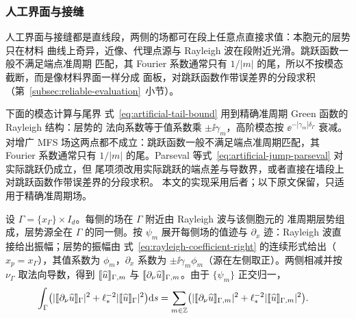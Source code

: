 \subsubsection{人工界面与接缝}

人工界面与接缝都是直线段，两侧的场都可在段上任意点直接求值：本胞元的层势只在材料
曲线上奇异，近像、代理点源与 Rayleigh 波在段附近光滑。跳跃函数一般不满足端点准周期
匹配，其 Fourier 系数通常只有 $1/|m|$ 的尾，所以不按模态截断，而是像材料界面一样分成
面板，对跳跃函数作带误差界的分段求积（第~\ref{subsec:reliable-evaluation}~小节）。


\begin{workonly}
下面的模态计算与尾界
式~\eqref{eq:artificial-tail-bound} 用到精确准周期 Green 函数的 Rayleigh 结构：层势的
法向系数等于值系数乘 $\pm\ii\gamma_m$，高阶模态按 $\ee^{-|\gamma_m|\delta_\Gamma}$ 衰减。
对增广 MFS 场这两点都不成立：跳跃函数一般不满足端点准周期匹配，其 Fourier 系数通常只有
$1/|m|$ 的尾。Parseval 等式~\eqref{eq:artificial-jump-parseval} 对实际跳跃仍成立，但
尾项须改用实际跳跃的端点差与导数界，或者直接在墙段上对跳跃函数作带误差界的分段求积。
本文的实现采用后者；以下原文保留，只适用于精确准周期场。

设 $\Gamma=\{x_\Gamma\}\times I_d$。每侧的场在 $\Gamma$ 附近由 Rayleigh 波与该侧胞元的
准周期层势组成，层势源全在 $\Gamma$ 的同一侧。按 $\psi_m$ 展开每侧场的值迹与
$\partial_x$ 迹：Rayleigh 波直接给出振幅；层势的振幅由
式~\eqref{eq:rayleigh-coefficient-right} 的连续形式给出（$x_p=x_\Gamma$），其值系数为
$\phi_m$，$\partial_x$ 系数为 $\pm\ii\gamma_m\phi_m$（源在左侧取正）。两侧相减并按
$\nu_\Gamma$ 取法向导数，得到 $\llbracket \widehat u\rrbracket_{\Gamma,m}$ 与
$\llbracket \partial_\nu\widehat u\rrbracket_{\Gamma,m}$。由于 $\{\psi_m\}$ 正交归一，
\begin{align}
  \int_\Gamma\bigl(|\llbracket \partial_\nu\widehat u\rrbracket_\Gamma|^2
    +\ell_*^{-2}|\llbracket \widehat u\rrbracket_\Gamma|^2\bigr)\mathrm{d} s
  &=\sum_{m\in\mathbb{Z}}\bigl(|\llbracket \partial_\nu\widehat u\rrbracket_{\Gamma,m}|^2
    +\ell_*^{-2}|\llbracket \widehat u\rrbracket_{\Gamma,m}|^2\bigr).
  \label{eq:artificial-jump-parseval}
\end{align}


\end{workonly}
